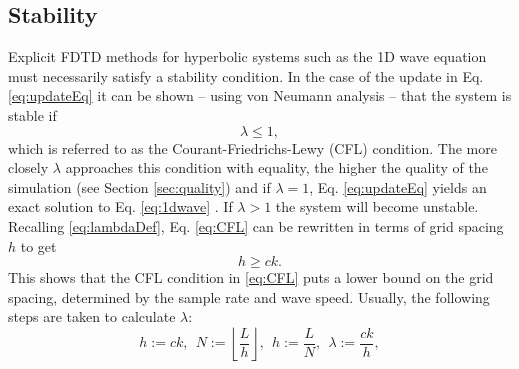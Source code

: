 \subsection{Stability}\label{sec:stability}
Explicit FDTD methods for hyperbolic systems such as the 1D wave equation must necessarily satisfy a stability condition. In the case of the update in Eq. \eqref{eq:updateEq} it can be shown -- using von Neumann analysis \cite{Strikwerda1989} -- that the system is stable if
\begin{equation}\label{eq:CFL}
    \lambda \leq 1,
\end{equation}
which is referred to as the Courant-Friedrichs-Lewy (CFL) condition. The more closely $\lambda$ approaches this condition with equality, the higher the quality of the simulation (see Section \ref{sec:quality}) and if $\lambda = 1$, Eq. \eqref{eq:updateEq} yields an exact solution to Eq. \eqref{eq:1dwave}%
. If $\lambda > 1$ the system will become unstable.
%
%
Recalling \eqref{eq:lambdaDef}, Eq. \eqref{eq:CFL} can be rewritten in terms of grid spacing $h$ to get
\begin{equation}\label{eq:stabilityCond}
    h \geq ck.
\end{equation}
This shows that the CFL condition in \eqref{eq:CFL} puts a lower bound on the grid spacing, determined by the sample rate and wave speed. Usually, the following steps are taken to calculate $\lambda$:
\begin{equation}\label{eq:orderOfCalcGrid}
    h := ck,\ \ N := \left\lfloor\frac{L}{h}\right\rfloor, \ \ h := \frac{L}{N}, \ \ \lambda := \frac{ck}{h},
\end{equation}
